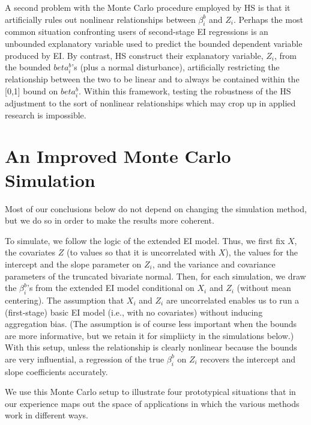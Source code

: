 \documentclass[11pt,titlepage]{article}
\begin{document}
A second problem with the Monte Carlo procedure employed by HS is that
it artificially rules out nonlinear relationships between $\beta_i^b$
and $Z_i$.  Perhaps the most common situation confronting users of
second-stage EI regressions is an unbounded explanatory variable used
to predict the bounded dependent variable produced by EI.  By
contrast, HS construct their explanatory variable, $Z_i$, from the
bounded $beta_i^b$'s (plus a normal disturbance), artificially
restricting the relationship between the two to be linear and to
always be contained within the [0,1] bound on $beta_i^b$.  Within this
framework, testing the robustness of the HS adjustment to the sort of
nonlinear relationships which may crop up in applied research is
impossible.

\section{An Improved Monte Carlo Simulation} \label{s:alt}

Most of our conclusions below do not depend on changing the simulation
method, but we do so in order to make the results more coherent.

To simulate, we follow the logic of the extended EI model.  Thus, we
first fix $X$, the covariates $Z$ (to values so that it is
uncorrelated with $X$), the values for the intercept and the slope
parameter on $Z_i$, and the variance and covariance parameters of the
truncated bivariate normal.  Then, for each simulation, we draw the
$\beta_i^b$'s from the extended EI model conditional on $X_i$ and
$Z_i$ (without mean centering).  The assumption that $X_i$ and $Z_i$
are uncorrelated enables us to run a (first-stage) basic EI model
(i.e., with no covariates) without inducing aggregation bias.  (The
assumption is of course less important when the bounds are more
informative, but we retain it for simpliicty in the simulations
below.)  With this setup, unless the relationship is clearly nonlinear
because the bounds are very influential, a regression of the true
$\beta_i^b$ on $Z_i$ recovers the intercept and slope coefficients
accurately.

We use this Monte Carlo setup to illustrate four prototypical
situations that in our experience maps out the space of applications
in which the various methods work in different ways.
\end{document}
